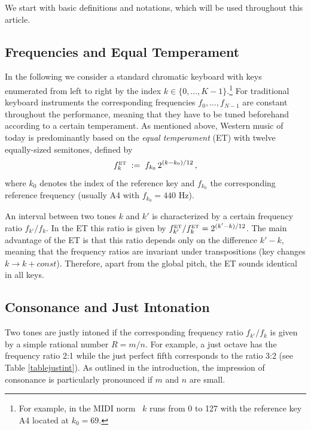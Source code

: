 We start with basic definitions and notations, which will be used throughout this article.

\subsection{Frequencies and Equal Temperament}
In the following we consider a standard chromatic keyboard with keys enumerated from left to right by the index $k \in \{0,\ldots,K-1\}$.\footnote{For example, in the MIDI norm~\cite{MidiNorm} $k$ runs from 0 to 127 with the reference key A4 located at $k_0=69$.} For traditional keyboard instruments the corresponding frequencies $f_0,\ldots,f_{N-1}$ are constant throughout the performance, meaning that they have to be tuned beforehand according to a certain temperament. As mentioned above, Western music of today is predominantly based on the \textit{equal temperament} (ET) with twelve equally-sized semitones, defined by 
%
\begin{equation}
\label{fET}
f_k^{\rm\scriptscriptstyle ET} \;:=\; f_{k_0} \, 2^{(k-k_0)/12}\,,
\end{equation}
%
where $k_0$ denotes the index of the reference key and $f_{k_0}$ the corresponding reference frequency (usually A4 with $f_{k_0}=440$ Hz). 

An interval between two tones $k$ and $k'$ is characterized by a certain frequency ratio $f_{k'}/f_{k}$. In the ET this ratio is given by $f_{k'}^{\rm\scriptscriptstyle ET}/f_{k}^{\rm\scriptscriptstyle ET} = 2^{(k'-k)/12}$. The main advantage of the ET is that this ratio depends only on the difference $k'-k$, meaning that the frequency ratios are invariant under transpositions (key changes $k\to k+const$). Therefore, apart from the global pitch, the ET sounds identical in all keys. 

\subsection{Consonance and Just Intonation}
Two tones are justly intoned if the corresponding frequency ratio $f_{k'}/f_{k}$ is given by a simple rational number $R=m/n$. For example, a just octave has the frequency ratio 2:1 while the just perfect fifth corresponds to the ratio 3:2 (see Table \ref{tablejustint}). As outlined in the introduction, the impression of consonance is particularly pronounced if $m$ and $n$ are small. 

